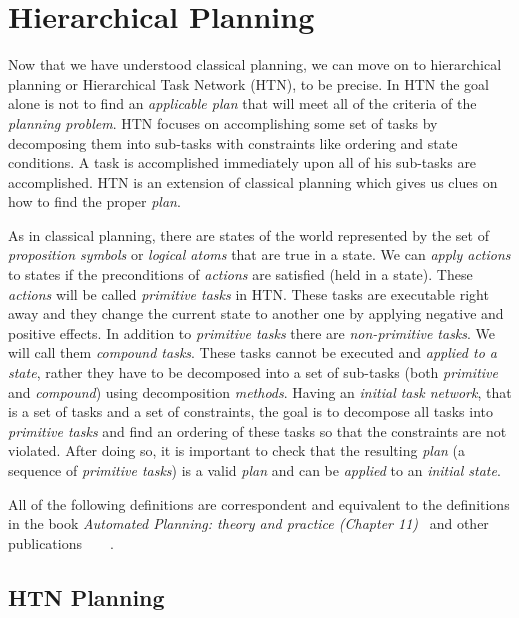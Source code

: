 \chapter{Hierarchical {P}lanning}

\medskip\noindent
Now that we have understood classical planning, we can move on to hierarchical planning or Hierarchical Task Network (HTN), to be precise. In HTN the goal alone is not to find an \emph{applicable plan} that will meet all of the criteria of the \emph{planning problem}. HTN focuses on accomplishing some set of tasks by decomposing them into sub-tasks with constraints like ordering and state conditions. A task is accomplished immediately upon all of his sub-tasks are accomplished. HTN is an extension of classical planning which gives us clues on how to find the proper \emph{plan}.

\medskip\noindent
As in classical planning, there are states of the world represented by the set of \emph{proposition symbols} or \emph{logical atoms} that are true in a state. We can \emph{apply actions} to states if the preconditions of \emph{actions} are satisfied (held in a state). These \emph{actions} will be called \emph{primitive tasks} in HTN. These tasks are executable right away and they change the current state to another one by applying negative and positive effects. In addition to \emph{primitive tasks} there are \emph{non-primitive tasks}. We will call them \emph{compound tasks}. These tasks cannot be executed and \emph{applied to a state}, rather they have to be decomposed into a set of sub-tasks (both \emph{primitive} and \emph{compound}) using decomposition \emph{methods}. Having an \emph{initial task network}, that is a set of tasks and a set of constraints, the goal is to decompose all tasks into \emph{primitive tasks} and find an ordering of these tasks so that the constraints are not violated. After doing so, it is important to check that the resulting \emph{plan} (a sequence of \emph{primitive tasks}) is a valid \emph{plan} and can be \emph{applied} to an \emph{initial state}.

\medskip\noindent
All of the following definitions are correspondent and equivalent to the definitions in the book \emph{Automated Planning: theory and practice (Chapter 11)}~\cite{nau} and other publications~\cite{langclassification}~\cite{cmyk}~\cite{ondrckova2023semantics}~\cite{ondrckova2024empty}.

\section{HTN Planning}

